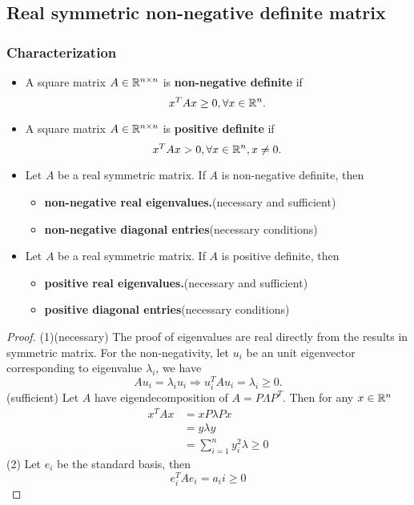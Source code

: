 \begin{refsection}
\subsection{Real symmetric non-negative definite matrix}
\subsubsection{Characterization}
\begin{definition}\hfill
\begin{itemize}
	\item A square matrix $A \in \mathbb{R}^{n\times n}$ is \textbf{non-negative definite} if
	$$x^T A x \geq 0, \forall x\in \mathbb{R}^n.$$
	\item A square matrix $A \in \mathbb{R}^{n\times n}$ is \textbf{positive definite} if
	$$x^T A x > 0, \forall x\in \mathbb{R}^n, x\neq 0.$$
\end{itemize}	
	
\end{definition}


\begin{lemma}\label{ch:linearalgebra:th:characterizeNonnegativeDefiniteMatrixbyEigenvalueAndEntries}\hfill
\begin{itemize}
	\item 	Let $A$ be a real symmetric matrix. If  $A$ is non-negative definite, then
	\begin{itemize}
		\item \textbf{non-negative real eigenvalues.}(necessary and sufficient)
		\item \textbf{non-negative diagonal entries}(necessary conditions)
	\end{itemize} 
\item 	Let $A$ be a real symmetric matrix. If  $A$ is positive definite, then
\begin{itemize}
	\item \textbf{positive real eigenvalues.}(necessary and sufficient)
	\item \textbf{positive diagonal entries}(necessary conditions)
\end{itemize} 
\end{itemize}	

\end{lemma}
\begin{proof}
	(1)(necessary)
	The proof of eigenvalues are real directly from the results in symmetric matrix. For the non-negativity, let $u_i$ be an unit eigenvector corresponding to eigenvalue $\lambda_i$, we have
	$$Au_i = \lambda_i u_i \Rightarrow u_i^T A u_i = \lambda_i \geq 0.$$
	(sufficient)
	Let $A$ have eigendecomposition of $A = P\Lambda P^T$. Then for any $x\in \mathbb{R}^n$
	\begin{align*}
	x^TAx &= xP\lambda Px\\
	&= y\lambda y \\
	&= \sum_{i=1}^n y_i^2 \lambda \geq 0
	\end{align*}
	(2) Let $e_i$ be the standard basis, then
	$$e_i^TAe_i = a_ii \geq 0$$
\end{proof}


\end{refsection}
